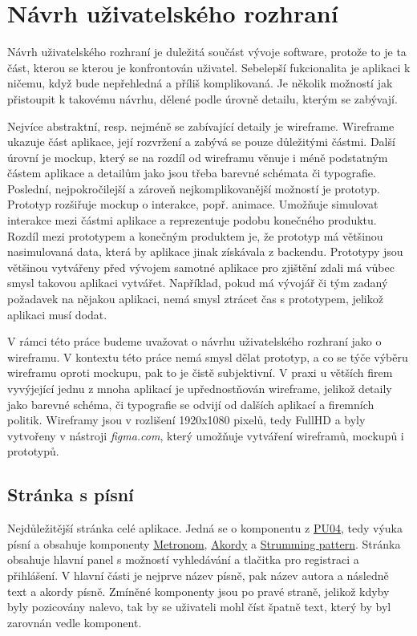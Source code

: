 \section{Návrh uživatelského rozhraní}
\label{sc:wireframes}
Návrh uživatelského rozhraní je duležitá součást vývoje software, protože to je ta část, kterou se kterou je konfrontován uživatel. Sebelepší fukcionalita je aplikaci k ničemu, když bude nepřehledná a příliš komplikovaná. Je několik možností jak přistoupit k takovému návrhu, dělené podle úrovně detailu, kterým se zabývají.

Nejvíce abstraktní, resp. nejméně se zabívající detaily je wireframe. Wireframe ukazuje část aplikace, její rozvržení a zabývá se pouze důležitými částmi. Další úrovní je mockup, který se na rozdíl od wireframu věnuje i méně podstatným částem aplikace a detailům jako jsou třeba barevné schémata či typografie. Poslední, nejpokročilejší a zároveň nejkomplikovanější možností je prototyp. Prototyp rozšiřuje mockup o interakce, popř. animace. Umožňuje simulovat interakce mezi částmi aplikace a reprezentuje podobu konečného produktu. Rozdíl mezi prototypem a konečným produktem je, že prototyp má většinou nasimulovaná data, která by aplikace jinak získávala z backendu. Prototypy jsou většinou vytvářeny před vývojem samotné aplikace pro zjištění zdali má vůbec smysl takovou aplikaci vytvářet. Například, pokud má vývojář či tým zadaný požadavek na nějakou aplikaci, nemá smysl ztrácet čas s prototypem, jelikož aplikaci musí dodat.

V rámci této práce budeme uvažovat o návrhu uživatelského rozhraní jako o wireframu. V kontextu této práce nemá smysl dělat prototyp, a co se týče výběru wireframu oproti mockupu, pak to je čistě subjektivní. V praxi u větších firem vyvýjející jednu z mnoha aplikací je upřednostňován wireframe, jelikož detaily jako barevné schéma, či typografie se odvijí od dalších aplikací a firemních politik. Wireframy jsou v rozlišení 1920x1080 pixelů, tedy FullHD a byly vytvořeny v nástroji \emph{figma.com}, který umožňuje vytváření wireframů, mockupů i prototypů.

\subsection{Stránka s písní}
\label{ss:wireframe_song}
Nejdůležitější stránka celé aplikace. Jedná se o komponentu z \hyperref[uc04]{PU04}, tedy výuka písní a obsahuje komponenty \hyperref[uc1]{Metronom}, \hyperref[uc2]{Akordy} a \hyperref[uc3]{Strumming pattern}. Stránka obsahuje hlavní panel s možností vyhledávání a tlačitka pro registraci a přihlášení. V hlavní části je nejprve název písně, pak název autora a následně text a akordy písně. Zmíněné komponenty jsou po pravé straně, jelikož kdyby byly pozicovány nalevo, tak by se uživateli mohl číst špatně text, který by byl zarovnán vedle komponent.

